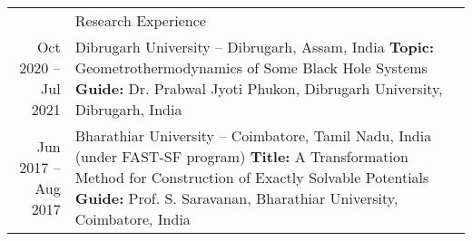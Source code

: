 \documentclass[a4paper, 11pt]{article}
\newcommand{\headingfont}{\Large\color{Bittersweet}}
\newenvironment{SectionTable}[1]{
	\renewcommand*{\arraystretch}{1.7}
	\setlength{\tabcolsep}{10pt}
	\begin{longtable}{Rp{5.2in}} & #1 \\}
{\end{longtable}\vspace{-.3cm}}
\begin{document}
\begin{SectionTable}{\headingfont Research Experience}

Oct 2020 \newline -- Jul 2021 &
Dibrugarh University -- Dibrugarh, Assam, India \newline
\textbf{Topic:} Geometrothermodynamics of Some Black Hole Systems \newline
\textbf{Guide:} Dr. Prabwal Jyoti Phukon, Dibrugarh University, Dibrugarh, India  \\

Jun 2017 \newline -- Aug 2017 &
Bharathiar University -- Coimbatore, Tamil Nadu, India (under FAST-SF program) \newline
\textbf{Title:} A Transformation Method for Construction of Exactly Solvable Potentials \newline
\textbf{Guide:} Prof. S. Saravanan, Bharathiar University, Coimbatore, India
\\
\end{SectionTable}








\end{document}

